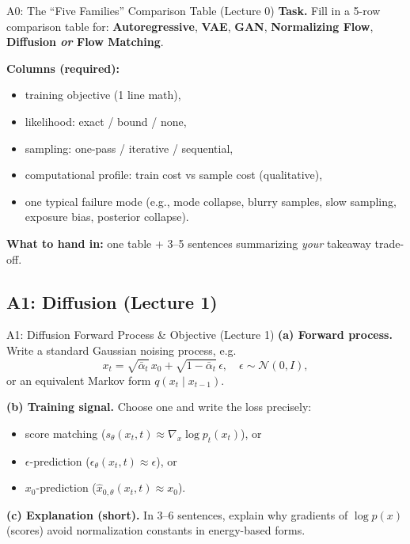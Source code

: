 \documentclass[aspectratio=169]{beamer}
\begin{document}
\begin{frame}{A0: The ``Five Families'' Comparison Table (Lecture 0)}
\small
\textbf{Task.} Fill in a 5-row comparison table for:
\textbf{Autoregressive}, \textbf{VAE}, \textbf{GAN}, \textbf{Normalizing Flow}, \textbf{Diffusion \emph{or} Flow Matching}.
\vspace{0.4em}

\textbf{Columns (required):}
\begin{itemize}
  \item training objective (1 line math),
  \item likelihood: exact / bound / none,
  \item sampling: one-pass / iterative / sequential,
  \item computational profile: train cost vs sample cost (qualitative),
  \item one typical failure mode (e.g., mode collapse, blurry samples, slow sampling, exposure bias, posterior collapse).
\end{itemize}
\vspace{0.4em}
\textbf{What to hand in:} one table + 3--5 sentences summarizing \emph{your} takeaway trade-off.
\end{frame}

\subsection{A1: Diffusion (Lecture 1)}

\begin{frame}{A1: Diffusion Forward Process \& Objective (Lecture 1)}
\small
\textbf{(a) Forward process.} Write a standard Gaussian noising process, e.g.
\[
x_t = \sqrt{\bar\alpha_t}\,x_0 + \sqrt{1-\bar\alpha_t}\,\epsilon,\quad \epsilon\sim \mathcal{N}(0,I),
\]
or an equivalent Markov form $q(x_t\mid x_{t-1})$.
\vspace{0.4em}

\textbf{(b) Training signal.} Choose one and write the loss precisely:
\begin{itemize}
  \item score matching ($s_\theta(x_t,t)\approx \nabla_x \log p_t(x_t)$), or
  \item $\epsilon$-prediction ($\epsilon_\theta(x_t,t)\approx \epsilon$), or
  \item $x_0$-prediction ($\hat x_{0,\theta}(x_t,t)\approx x_0$).
\end{itemize}
\vspace{0.4em}
\textbf{(c) Explanation (short).} In 3--6 sentences, explain why gradients of $\log p(x)$ (scores) avoid normalization constants in energy-based forms.
\end{frame}
\end{document}
